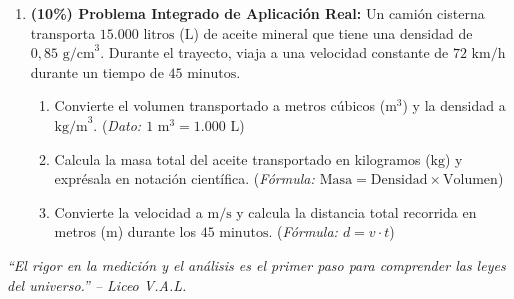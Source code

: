 \documentclass[11pt, letterpaper]{article}
\newif\ifshowanswers
\newcommand{\answer}[1]{
	\ifshowanswers
	\par\vspace{0.15cm}
	\begin{tcolorbox}[colback=blue!5!white, colframe=blue!60!white, arc=1mm, boxrule=0.5pt, title=\textbf{\footnotesize SOLUCIÓN PASO A PASO (DOCENTE)}]
		\color{blue!80!black}\footnotesize #1
	\end{tcolorbox}
	\par\vspace{0.15cm}
	\else
	\par\vspace{0.3cm}
	\fi
}
\begin{document}
\begin{enumerate}[leftmargin=*, itemsep=0.8cm]
		\item \textbf{(10\%) Problema Integrado de Aplicación Real:} 
		Un camión cisterna transporta $15.000\text{ litros}$ ($\text{L}$) de aceite mineral que tiene una densidad de $0,85\text{ g/cm}^3$. Durante el trayecto, viaja a una velocidad constante de $72\text{ km/h}$ durante un tiempo de $45\text{ minutos}$.
		\begin{enumerate}[label=\alph*), itemsep=0.2cm]
			\item Convierte el volumen transportado a metros cúbicos ($\text{m}^3$) y la densidad a $\text{kg/m}^3$. \quad (\textit{Dato: $1\text{ m}^3 = 1.000\text{ L}$})
			\item Calcula la masa total del aceite transportado en kilogramos ($\text{kg}$) y exprésala en notación científica. \quad (\textit{Fórmula: $\text{Masa} = \text{Densidad} \times \text{Volumen}$})
			\item Convierte la velocidad a $\text{m/s}$ y calcula la distancia total recorrida en metros ($\text{m}$) durante los $45\text{ minutos}$. \quad (\textit{Fórmula: $d = v \cdot t$})
		\end{enumerate}
		
		\answer{
			\textbf{Solución integrada paso a paso:}
			\begin{itemize}[itemsep=0.2cm]
				\item a) Volumen: $15.000\text{ L} \times \left(\frac{1\text{ m}^3}{1.000\text{ L}}\right) = \mathbf{15\text{ m}^3}$. \\
				Densidad: $0,85\text{ g/cm}^3 \times 1.000 = \mathbf{850\text{ kg/m}^3}$.
				\item b) Masa: $m = \text{Densidad} \times \text{Volumen} = 850\text{ kg/m}^3 \times 15\text{ m}^3 = \mathbf{12.750\text{ kg}}$. \\
				En notación científica: $\mathbf{1,275 \times 10^4\text{ kg}}$.
				\item c) Velocidad: $72\text{ km/h} = \mathbf{20\text{ m/s}}$. \\
				Tiempo: $45\text{ min} \times 60\text{ s/min} = \mathbf{2.700\text{ s}}$. \\
				Distancia: $d = v \cdot t = 20\text{ m/s} \times 2.700\text{ s} = \mathbf{54.000\text{ m}}$ ($54\text{ km}$ o $5,4 \times 10^4\text{ m}$).
			\end{itemize}
		}
		
	\end{enumerate}
	
	\vfill
	\begin{center}
		\textit{\color{valdark!70} ``El rigor en la medición y el análisis es el primer paso para comprender las leyes del universo.'' -- Liceo V.A.L.}
	\end{center}
	
\end{document}
